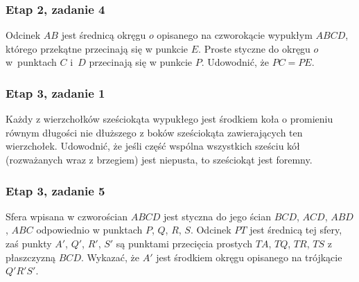 \subsubsection{Etap 2, zadanie 4}
Odcinek $AB$ jest średnicą okręgu $o$ opisanego na czworokącie wypukłym $ABCD$, którego przekątne przecinają się w punkcie $E$. Proste styczne do okręgu $o$ w~punktach $C$ i~$D$ przecinają się w punkcie $P$.
Udowodnić, że $PC = PE$.

\subsubsection{Etap 3, zadanie 1}
Każdy z wierzchołków sześciokąta wypukłego jest środkiem koła o promieniu równym długości nie dłuższego z boków sześciokąta zawierających ten wierzchołek.
Udowodnić, że jeśli część wspólna wszystkich sześciu kół (rozważanych wraz z brzegiem) jest niepusta, to sześciokąt jest foremny.

\subsubsection{Etap 3, zadanie 5}
Sfera wpisana w czworościan $ABCD$ jest styczna do jego ścian $BCD$, $ACD$, $ABD$, $ABC$ odpowiednio w punktach $P$, $Q$, $R$, $S$.
Odcinek $PT$ jest średnicą tej sfery, zaś punkty $A'$, $Q'$, $R'$, $S'$ są punktami przecięcia prostych $TA$, $TQ$, $TR$, $TS$ z płaszczyzną $BCD$.
Wykazać, że $A'$ jest środkiem okręgu opisanego na trójkącie $Q'R'S'$.
